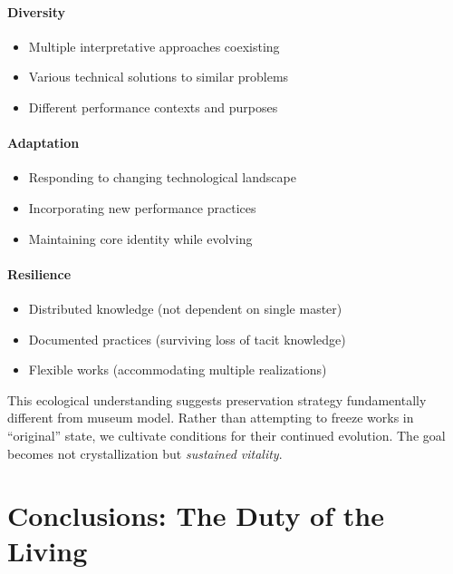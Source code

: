 \paragraph{Diversity}
\begin{itemize}
  \item Multiple interpretative approaches coexisting
  \item Various technical solutions to similar problems
  \item Different performance contexts and purposes
\end{itemize}

\paragraph{Adaptation}
\begin{itemize}
  \item Responding to changing technological landscape
  \item Incorporating new performance practices
  \item Maintaining core identity while evolving
\end{itemize}

\paragraph{Resilience}
\begin{itemize}
  \item Distributed knowledge (not dependent on single master)
  \item Documented practices (surviving loss of tacit knowledge)
  \item Flexible works (accommodating multiple realizations)
\end{itemize}

This ecological understanding suggests preservation strategy fundamentally 
different from museum model. Rather than attempting to freeze works in 
``original'' state, we cultivate conditions for their continued evolution. The 
goal becomes not crystallization but \emph{sustained vitality}.

\section{Conclusions: The Duty of the Living}

